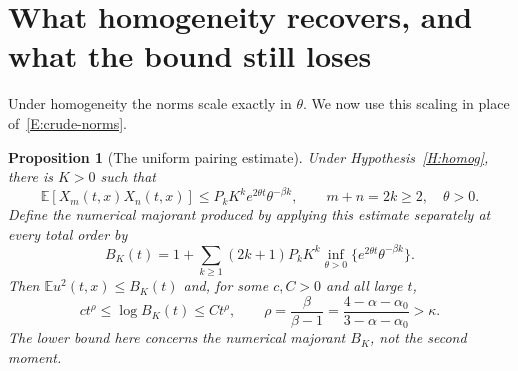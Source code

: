 \documentclass[12pt,oneside,openany]{book}
\makeatletter
\let\lean@pending\@empty
\newcommand{\LeanMarker}[1]{\gdef\lean@pending{#1}}
\numberwithin{equation}{section}
\newtheorem{proposition}[theorem]{Proposition}
\theoremstyle{nogostyle}
\theoremstyle{definition}
\newcommand{\E}{\mathbb{E}}
\makeatother
\begin{document}
\section{What homogeneity recovers, and what the bound still loses}

Under homogeneity the norms scale exactly in $\theta$. We now use this
scaling in place of~\eqref{E:crude-norms}.
\LeanMarker{P:envelope}%
\begin{proposition}[The uniform pairing estimate]\label{P:envelope}
  Under Hypothesis~\ref{H:homog}, there is $K > 0$ such that
  \begin{equation}\label{E:homogeneous-envelope}
    \E[X_m(t,x)X_n(t,x)]
    \le P_k K^k e^{2\theta t}\theta^{-\beta k},
    \qquad m+n=2k\ge2,\quad\theta>0.
  \end{equation}
  Define the numerical majorant produced by applying this estimate separately at
  every total order by
  \begin{equation}\label{E:B-envelope}
    B_K(t)=1+\sum_{k\ge1}(2k+1)P_kK^k
    \inf_{\theta>0}\{e^{2\theta t}\theta^{-\beta k}\}.
  \end{equation}
  Then $\E u^2(t,x) \le B_K(t)$ and, for some $c,C > 0$ and all large $t$,
  \begin{equation}\label{E:envelope-growth}
    ct^{\rho}\le\log B_K(t)\le Ct^{\rho},\qquad
    \rho=\frac{\beta}{\beta-1}
    =\frac{4-\alpha-\alpha_0}{3-\alpha-\alpha_0}>\kappa.
  \end{equation}
  The lower bound here concerns the numerical majorant $B_K$, not the second
  moment.
\end{proposition}
\end{document}
